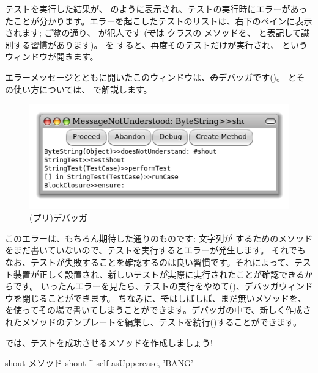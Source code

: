 \documentclass[a4paper,10pt,twoside]{book}
\begin{document}
テストを実行した結果が、 のように表示され、テストの実行時にエラーがあったことが分かります。エラーを起こしたテストのリストは、右下のペインに表示されます; ご覧の通り、 が犯人です
(\st では  クラスの  メソッドを、 と表記して識別する習慣があります)。
 を \click すると、再度そのテストだけが実行され、 というウィンドウが開きます。

エラーメッセージとともに開いたこのウィンドウは、\st のデバッガです()。
とその使い方については、 で解説します。

\begin{figure}[hbt]
\centerline {\includegraphics[width=\textwidth]{Predebugger}}
\caption{(プリ)デバッガ}
\end{figure}

このエラーは、もちろん期待した通りのものです: 文字列が  するためのメソッドをまだ書いていないので、テストを実行するとエラーが発生します。
それでもなお、テストが失敗することを確認するのは良い習慣です。それによって、テスト装置が正しく設置され、新しいテストが実際に実行されたことが確認できるからです。
いったんエラーを見たら、テストの実行をやめて()、デバッガウィンドウを閉じることができます。
ちなみに、\st ではしばしば、まだ無いメソッドを、 を使ってその場で書いてしまうことができます。デバッガの中で、新しく作成されたメソッドのテンプレートを編集し、テストを続行()することができます。

では、テストを成功させるメソッドを作成しましょう!

\begin{method}[shout]{shout メソッド}
shout
	^ self asUppercase, 'BANG'
\end{method}
\end{document}
